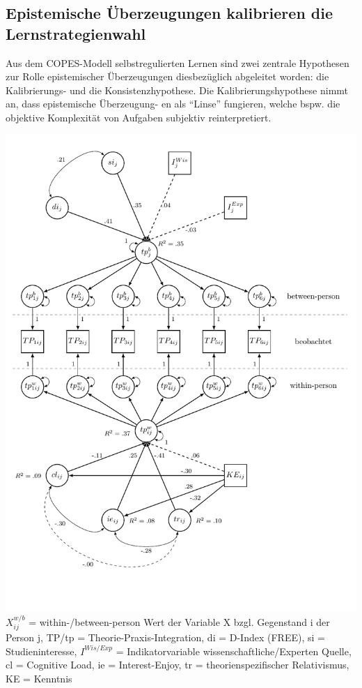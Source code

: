 \documentclass[]{tufte-handout}
\begin{document}
\subsection{Epistemische Überzeugungen kalibrieren die
Lernstrategienwahl}\label{epistemische-uberzeugungen-kalibrieren-die-lernstrategienwahl}

Aus dem COPES-Modell selbstregulierten Lernen sind zwei zentrale
Hypothesen zur Rolle epistemischer Überzeugungen diesbezüglich
abgeleitet worden: die Kalibrierungs- und die Konsistenzhypothese. Die
Kalibrierungshypothese nimmt an, dass epistemische Überzeugung- en als
``Linse'' fungieren, welche bspw. die objektive Komplexität von Aufgaben subjektiv
reinterpretiert.

\begin{marginfigure}
\includegraphics{../Img/mind_the_gap_mlsem.pdf} \(X_{ij}^{w/b}\) =
within-/between-person Wert der Variable X bzgl. Gegenstand i der Person
j, TP/tp = Theorie-Praxis-Integration, di = D-Index (FREE), si =
Studieninteresse, \(I^{Wis/Exp}\) = Indikatorvariable
wissenschaftliche/Experten Quelle, cl = Cognitive Load, ie =
Interest-Enjoy, tr = theorienspezifischer Relativismus, KE = Kenntnis
\end{marginfigure}
\end{document}
